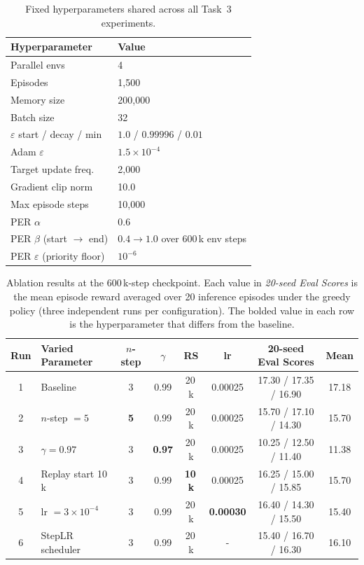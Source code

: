 \documentclass[12pt,a4paper]{report}
\begin{document}
\begin{table}[H]
\centering
\caption{Fixed hyperparameters shared across all Task~3 experiments.}
{\setlength{\tabcolsep}{14pt}
\begin{tabular}{ll}
\toprule
\textbf{Hyperparameter} & \textbf{Value} \\
\midrule
Parallel envs           & 4 \\
Episodes                & 1{,}500 \\
Memory size             & 200{,}000 \\
Batch size              & 32 \\
$\varepsilon$ start / decay / min & $1.0$ / $0.99996$ / $0.01$ \\
Adam $\varepsilon$      & $1.5\times10^{-4}$ \\
Target update freq.     & 2{,}000 \\
Gradient clip norm      & 10.0 \\
Max episode steps       & 10{,}000 \\
PER $\alpha$            & 0.6 \\
PER $\beta$ (start $\to$ end) & $0.4 \to 1.0$ over 600\,k env steps \\
PER $\varepsilon$ (priority floor) & $10^{-6}$ \\
\bottomrule
\end{tabular}}
\end{table}

\begin{table}[H]
\centering
\caption{Ablation results at the 600\,k-step checkpoint.
         Each value in \emph{20-seed Eval Scores} is the mean episode reward averaged over 20 inference
         episodes under the greedy policy (three independent runs per configuration).
         The bolded value in each row is the hyperparameter that differs from the baseline.}
{\footnotesize
\begin{tabular}{clcccccc}
\toprule
\textbf{Run} & \textbf{Varied Parameter} & $n$\textbf{-step} & $\gamma$ & \textbf{RS} & \textbf{lr} & \textbf{20-seed Eval Scores} & \textbf{Mean} \\
\midrule
1 & Baseline               & 3          & 0.99          & 20\,k          & 0.00025          & 17.30 / 17.35 / 16.90  & 17.18 \\
2 & $n$-step $= 5$         & \textbf{5} & 0.99          & 20\,k          & 0.00025          & 15.70 / 17.10 / 14.30   & 15.70 \\
3 & $\gamma = 0.97$        & 3          & \textbf{0.97} & 20\,k          & 0.00025          & 10.25 / 12.50 / 11.40  & 11.38 \\
4 & Replay start 10\,k     & 3          & 0.99          & \textbf{10\,k} & 0.00025          & 16.25 / 15.00 / 15.85 & 15.70 \\
5 & lr $= 3\times10^{-4}$  & 3          & 0.99          & 20\,k          & \textbf{0.00030} & 16.40 / 14.30 / 15.50   & 15.40 \\
6 & StepLR scheduler       & 3          & 0.99          & 20\,k          & -                & 15.40 / 16.70 / 16.30   & 16.10 \\
\bottomrule
\end{tabular}}
\end{table}
\end{document}
